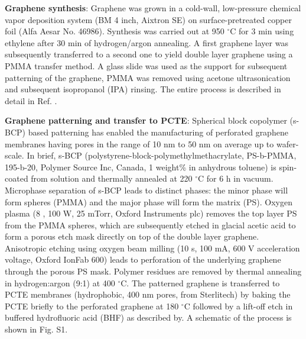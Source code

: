 \documentclass[journal=langd5,email=true, hyperref=true, keywords=false]{achemso}
\begin{document}
\textbf{Graphene synthesis}: Graphene was grown in a cold-wall,
low-pressure chemical vapor deposition system (BM 4 inch, Aixtron SE)
on surface-pretreated copper foil (Alfa Aesar No. 46986). Synthesis was
carried out at 950 $^{\circ}$C for 3 min using ethylene after 30 min of
hydrogen/argon annealing. A first graphene layer was subsequently
transferred to a second one to yield double layer graphene using a
PMMA transfer method. A glass slide was used as the support for
subsequent patterning of the graphene, PMMA was removed using acetone
ultrasonication and subsequent isopropanol (IPA) rinsing. The entire
process is described in detail in Ref. .

\vspace{1em}
\noindent
\textbf{Graphene patterning and transfer to PCTE}: Spherical block
copolymer (s-BCP) based patterning has enabled the manufacturing of
perforated graphene membranes having pores in the range of 10 nm to 50
nm on average up to wafer-scale\cite{Choi_2018}. In brief, s-BCP
(polystyrene-block-polymethylmethacrylate, PS-b-PMMA, 195-b-20,
Polymer Source Inc, Canada, 1 weight\% in anhydrous toluene) is
spin-coated from solution and thermally annealed at 220 $^{\circ}$C
for 6 h in vacuum. Microphase separation of s-BCP leads to distinct
phases: the minor phase will form spheres (PMMA) and the major phase
will form the matrix (PS). Oxygen plasma (8 , 100 W, 25 mTorr, Oxford
Instruments plc) removes the top layer PS from the PMMA spheres, which
are subsequently etched in glacial acetic acid to form a porous
etch mask directly on top of the double layer graphene. Anisotropic
etching using oxygen beam milling (10 s, 100 mA, 600 V acceleration
voltage, Oxford IonFab 600) leads to perforation of the underlying
graphene through the porous PS mask. Polymer residues are removed by
thermal annealing in hydrogen:argon (9:1) at 400 $^{\circ}$C. The
patterned graphene is transferred to PCTE membranes (hydrophobic, 400
nm pores, from Sterlitech) by baking the PCTE briefly to the
perforated graphene at 180 $^{\circ}$C followed by a lift-off etch in
buffered hydrofluoric acid (BHF) as described by\cite{Choi_2018}. A
schematic of the process is shown in Fig. S1.
\end{document}
